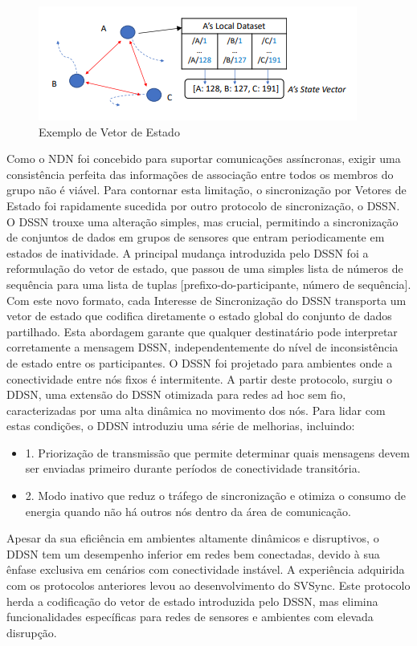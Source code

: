 \begin{figure}[h]
    \centering
    \includegraphics{Chapters/Figures/svs.png}
    \caption{Exemplo de Vetor de Estado \cite{li_brief_2018}} 
    \label{fig:SV}   
\end{figure}

Como o NDN foi concebido para suportar comunicações assíncronas, exigir uma consistência perfeita das informações de associação entre todos os membros do grupo não é viável. Para contornar esta limitação, o sincronização por Vetores de Estado foi rapidamente sucedida por outro protocolo de sincronização, o DSSN. O DSSN trouxe uma alteração simples, mas crucial, permitindo a sincronização de conjuntos de dados em grupos de sensores que entram periodicamente em estados de inatividade.
A principal mudança introduzida pelo DSSN foi a reformulação do vetor de estado, que passou de uma simples lista de números de sequência para uma lista de tuplas [prefixo-do-participante, número de sequência]. Com este novo formato, cada Interesse de Sincronização do DSSN transporta um vetor de estado que codifica diretamente o estado global do conjunto de dados partilhado. Esta abordagem garante que qualquer destinatário pode interpretar corretamente a mensagem DSSN, independentemente do nível de inconsistência de estado entre os participantes.
O DSSN foi projetado para ambientes onde a conectividade entre nós fixos é intermitente. A partir deste protocolo, surgiu o DDSN, uma extensão do DSSN otimizada para redes ad hoc sem fio, caracterizadas por uma alta dinâmica no movimento dos nós. Para lidar com estas condições, o DDSN introduziu uma série de melhorias, incluindo:

\begin{itemize}

    \item 1. Priorização de transmissão que permite determinar quais mensagens devem ser enviadas primeiro durante períodos de conectividade transitória.

   \item  2. Modo inativo que reduz o tráfego de sincronização e otimiza o consumo de energia quando não há outros nós dentro da área de comunicação.
\end{itemize}
Apesar da sua eficiência em ambientes altamente dinâmicos e disruptivos, o DDSN tem um desempenho inferior em redes bem conectadas, devido à sua ênfase exclusiva em cenários com conectividade instável. A experiência adquirida com os protocolos anteriores levou ao desenvolvimento do \gls{SVSync}. Este protocolo herda a codificação do vetor de estado introduzida pelo DSSN, mas elimina funcionalidades específicas para redes de sensores e ambientes com elevada disrupção.

